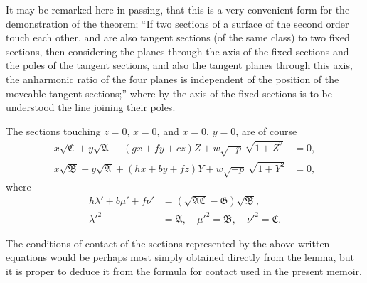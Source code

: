 \documentclass[11pt,a4paper]{book}
\begin{document}
It may be remarked here in passing, that this is a very convenient form for the demonstration of the theorem; ``If two sections of a surface of the second order touch each other, and are also tangent sections (of the same class) to two fixed sections, then considering the planes through the axis of the fixed sections and the poles of the tangent sections, and also the tangent planes through this axis, the anharmonic ratio of the four planes is independent of the position of the moveable tangent sections;'' where by the axis of the fixed sections is to be understood the line joining their poles.

The sections touching $z=0$, $x=0$, and $x=0$, $y=0$, are of course
\begin{align*}
x\sqrt{\mathfrak{C}} + y\sqrt{\mathfrak{A}} + (gx+fy+cz)Z + w\sqrt{-p}\,\sqrt{1+Z^2} &= 0,\\
x\sqrt{\mathfrak{B}} + y\sqrt{\mathfrak{A}} + (hx+by+fz)Y + w\sqrt{-p}\,\sqrt{1+Y^2} &= 0,
\end{align*}
where
\begin{align*}
h\lambda'+b\mu'+f\nu' &= (\sqrt{\mathfrak{A}\mathfrak{C}}-\mathfrak{G})\sqrt{\mathfrak{B}},\\
\lambda'^2 &= \mathfrak{A}, \quad \mu'^2 = \mathfrak{B}, \quad \nu'^2 = \mathfrak{C}.
\end{align*}

\newpage
\setcounter{page}{66}

The conditions of contact of the sections represented by the above written equations would be perhaps most simply obtained directly from the lemma, but it is proper to deduce it from the formula for contact used in the present memoir.
\end{document}
